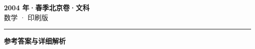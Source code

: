 \documentclass[zihao=5, a4paper]{ctexart}
\begin{document}
\begin{center}
  {\Large\bfseries 2004 年·春季北京卷·文科}\\[4pt]
  {\large 数学 · 印刷版}
\end{center}
\medskip
{}

\par\bigskip\hrule\bigskip
{}
\begin{center}{\large\bfseries 参考答案与详细解析}\end{center}
\smallskip

\end{document}
